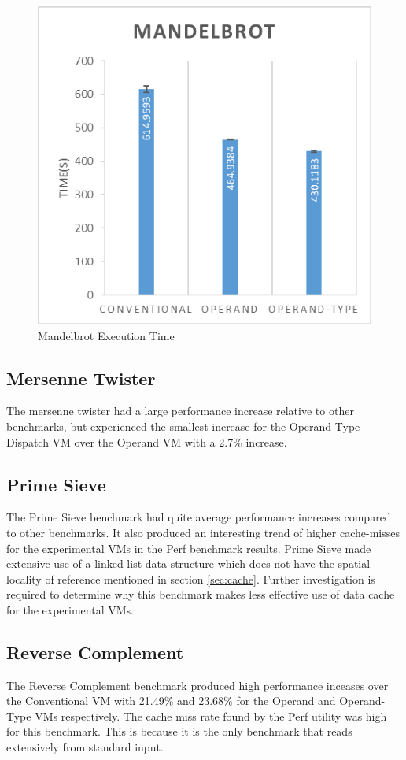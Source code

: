 \documentclass[english,a4paper,12pt]{report}
\begin{document}
\begin{figure}[!htb]
  \centering
  \includegraphics{mandelbrot.png}
  \caption{Mandelbrot Execution Time}
  \label{fig:mandel-time}
\end{figure}

\subsection{Mersenne Twister}
The mersenne twister had a large performance increase relative to
other benchmarks, but experienced the smallest increase for the
Operand-Type Dispatch VM over the Operand VM with a 2.7\% increase.

\subsection{Prime Sieve}
The Prime Sieve benchmark had quite average performance increases
compared to other benchmarks. It also produced an interesting trend of
higher cache-misses for the experimental VMs in the Perf benchmark
results. Prime Sieve made extensive use of a linked list data
structure which does not have the spatial locality of reference
mentioned in section \ref{sec:cache}. Further investigation is
required to determine why this benchmark makes less effective use of
data cache for the experimental VMs.

\subsection{Reverse Complement}
The Reverse Complement benchmark produced high performance inceases
over the Conventional VM with 21.49\% and 23.68\% for the Operand and
Operand-Type VMs respectively. The cache miss rate found by the Perf
utility was high for this benchmark. This is because it is the only
benchmark that reads extensively from standard input. 
\end{document}
